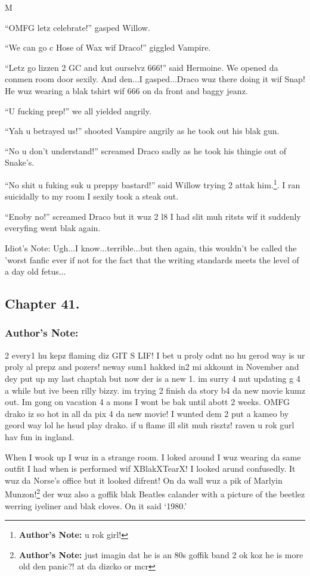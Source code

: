 M\documentclass{article}
\begin{document}
“OMFG letz celebrate!” gasped Willow.

“We can go c Hose of Wax wif Draco!” giggled Vampire.

“Letz go lizzen 2 GC and kut ourselvz 666!” said Hermoine. We opened da conmen room door sexily. And den...I gasped...Draco wuz there doing it wif Snap! He wuz wearing a blak tshirt wif 666 on da front and baggy jeanz.

“U fucking prep!” we all yielded angrily.

“Yah u betrayed us!” shooted Vampire angrily as he took out his blak gun.

“No u don’t understand!” screamed Draco sadly as he took his thingie out of Snake’s.

“No shit u fuking suk u preppy bastard!” said Willow trying 2 attak him.\footnote{\textbf{Author's Note: }u rok girl!}. I ran suicidally to my room I sexily took a steak out.

“Enoby no!” screamed Draco but it wuz 2 l8 I had slit muh ritsts wif it suddenly everyfing went blak again.

Idiot's Note: Ugh...I know...terrible...but then again, this wouldn't be called the 'worst fanfic ever if not for the fact that the writing standards meets the level of a day old fetus...

\clearpage\nolinenumbers
\subsection*{Chapter 41.}

\subsubsection*{Author's Note: }2 every1 hu kepz flaming diz GIT S LIF! I bet u proly odnt no hu gerod way is ur proly al prepz and pozers! neway sum1 hakked in2 mi akkount in November and dey put up my last chaptah but now der is a new 1. im surry 4 nut updating g 4 a while but ive been rilly bizzy. im trying 2 finish da story b4 da new movie kumz out. Im gong on vacation 4 a mons I wont be bak until abott 2 weeks. OMFG drako iz so hot in all da pix 4 da new movie! I wunted dem 2 put a kameo by geord way lol he hsud play drako. if u flame ill slit muh risztz! raven u rok gurl hav fun in ingland.

\textbreak
\linenumbers\resetlinenumber

When I wook up I wuz in a strange room. I loked around I wuz wearing da same outfit I had when is performed wif XBlakXTearX! I looked arund confusedly. It wuz da Norse’s office but it looked difrent! On da wall wuz a pik of Marlyin Munzon!\footnote{\textbf{Author's Note: }just imagin dat he is an 80s goffik band 2 ok koz he is more old den panic?! at da dizcko or mcr} der wuz also a goffik blak Beatles calander with a picture of the beetlez werring iyeliner and blak cloves. On it said ‘1980.’
\end{document}
